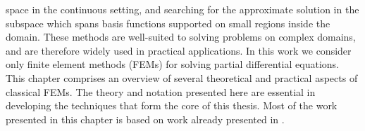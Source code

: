 space in the continuous setting, and searching for the approximate solution in the
subspace which spans basis functions supported on small regions inside the domain.
These methods are well-suited to solving problems on complex domains, and are
therefore widely used in practical applications.
In this work we consider only finite element methods (FEMs) for solving partial
differential equations.
This chapter comprises an overview of several theoretical and practical aspects of classical FEMs. The theory and notation presented here are essential in developing
the techniques that form the core of this thesis. Most of the work presented in this chapter is based on work already presented in \citet{arthursthesis,asnerthesis,bernabeusthesis,brenner2008mathematical,f1991mixed}.


%
